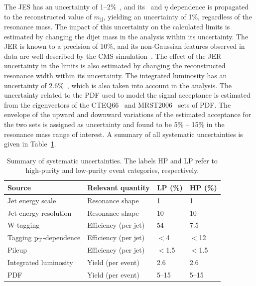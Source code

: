 The JES has an uncertainty of
1--2\%~\cite{JME-JINST,Collaboration:2013dp}, and its \pt~and $\eta$
dependence is propagated to the reconstructed value of
$m_\mathrm{jj}$, yielding an uncertainty of 1\%, regardless
of the resonance mass. The impact of this uncertainty on the
calculated limits is estimated by changing the dijet mass in the
analysis within its uncertainty. The JER is known to a precision of
10\%, and its non-Gaussian features observed in data are well
described by the CMS simulation~\cite{JME-JINST}. The effect of the
JER uncertainty in the limits is also estimated by changing the
reconstructed resonance width within its uncertainty. The integrated
luminosity has an uncertainty of 2.6\%~\cite{LUM-13-001}, which is
also taken into account in the analysis. The uncertainty related to
the PDF used to model the signal acceptance is estimated from the
eigenvectors of the CTEQ66~\cite{cteq} and MRST2006~\cite{mrst2006}
sets of PDF. The envelope of the upward and downward variations of the
estimated acceptance for the two sets is assigned as uncertainty and
found to be 5\% -- 15\% in the resonance mass range of interest. A
summary of all systematic uncertainties is given in
Table~\ref{table:uncertainties}.

\begin{table}[]
\begin{center}
  \caption{Summary of systematic uncertainties.  The labels HP and
    LP refer to high-purity and low-purity event categories,
    respectively.}
\begin{tabular}{ llll }
\hline
Source         &  Relevant quantity         & LP (\%)  & HP (\%)   \\
\hline
Jet energy scale       & Resonance shape    & 1  & 1    \\
Jet energy resolution    & Resonance shape    & 10 & 10     \\
W-tagging    & Efficiency (per jet)  & 54 & 7.5  \\
Tagging $\mathrm{p_{T}}$-dependence  & Efficiency (per jet)  & $<$4 & $<$12 \\
Pileup	           & Efficiency (per jet)    & $<$1.5 & $<$1.5    \\
Integrated luminosity    & Yield (per event)    & 2.6  & 2.6  \\
PDF       & Yield (per event)    & 5--15  & 5--15  \\
\hline
\end{tabular}
\label{table:uncertainties}
\end{center}
\end{table}






\clearpage
